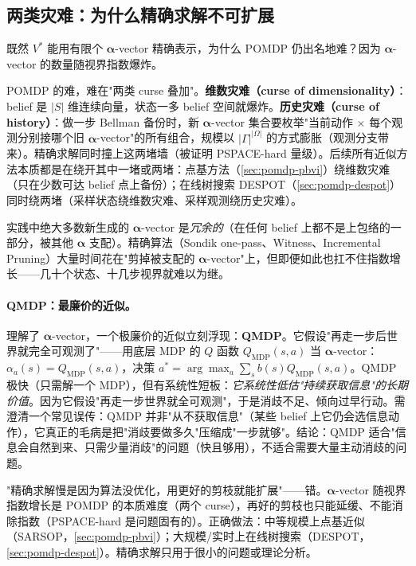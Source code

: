 \subsection{两类灾难：为什么精确求解不可扩展}
\label{sec:pomdp-curse}

既然 $V^*$ 能用有限个 $\boldsymbol{\alpha}$-vector 精确表示，为什么 POMDP 仍出名地难？因为 $\boldsymbol{\alpha}$-vector 的数量随视界指数爆炸。

\begin{insight}
POMDP 的难，难在"两类 curse 叠加"。\textbf{维数灾难（curse of dimensionality）}：belief 是 $|S|$ 维连续向量，状态一多 belief 空间就爆炸。\textbf{历史灾难（curse of history）}：做一步 Bellman 备份时，新 $\boldsymbol{\alpha}$-vector 集合要枚举"当前动作 $\times$ 每个观测分别接哪个旧 $\boldsymbol{\alpha}$-vector"的所有组合，规模以 $|\Gamma|^{|\Omega|}$ 的方式膨胀（观测分支带来）。精确求解同时撞上这两堵墙（被证明 PSPACE-hard 量级）。后续所有近似方法本质都是在绕开其中一堵或两堵：点基方法（\cref{sec:pomdp-pbvi}）绕维数灾难（只在少数可达 belief 点上备份）；在线树搜索 DESPOT（\cref{sec:pomdp-despot}）同时绕两堵（采样状态绕维数灾难、采样观测绕历史灾难）。
\end{insight}

实践中绝大多数新生成的 $\boldsymbol{\alpha}$-vector 是\emph{冗余的}（在任何 belief 上都不是上包络的一部分，被其他 $\boldsymbol{\alpha}$ 支配）。精确算法（Sondik one-pass、Witness、Incremental Pruning）大量时间花在"剪掉被支配的 $\boldsymbol{\alpha}$-vector"上，但即便如此也扛不住指数增长——几十个状态、十几步视界就难以为继。

\paragraph{QMDP：最廉价的近似。}
理解了 $\boldsymbol{\alpha}$-vector，一个极廉价的近似立刻浮现：\textbf{QMDP}。它假设"再走一步后世界就完全可观测了"——用底层 MDP 的 $Q$ 函数 $Q_{\mathrm{MDP}}(s,a)$ 当 $\boldsymbol{\alpha}$-vector：$\alpha_a(s)=Q_{\mathrm{MDP}}(s,a)$，决策 $a^*=\arg\max_a\sum_s b(s)Q_{\mathrm{MDP}}(s,a)$。QMDP 极快（只需解一个 MDP），但有系统性短板：\emph{它系统性低估"持续获取信息"的长期价值}。因为它假设"再走一步世界就全可观测"，于是消歧不足、倾向过早行动。需澄清一个常见误传：QMDP 并非"从不获取信息"（某些 belief 上它仍会选信息动作），它真正的毛病是把"消歧要做多久"压缩成"一步就够"。结论：QMDP 适合"信息会自然到来、只需少量消歧"的问题（快且够用），不适合需要大量主动消歧的问题。

\begin{pitfall}
"精确求解慢是因为算法没优化，用更好的剪枝就能扩展"——错。$\boldsymbol{\alpha}$-vector 随视界指数增长是 POMDP 的本质难度（两个 curse），再好的剪枝也只能延缓、不能消除指数（PSPACE-hard 是问题固有的）。正确做法：中等规模上点基近似（SARSOP，\cref{sec:pomdp-pbvi}）；大规模/实时上在线树搜索（DESPOT，\cref{sec:pomdp-despot}）。精确求解只用于很小的问题或理论分析。
\end{pitfall}

